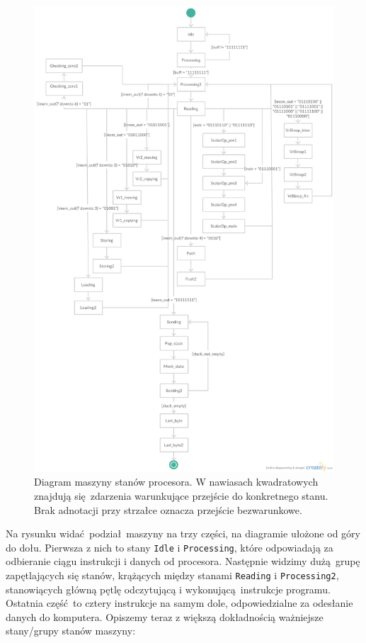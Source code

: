 \begin{figure}
  \begin{center}
    \includegraphics[scale=0.4]{images/Processor-State-Machine.png}
    \caption{Diagram maszyny stanów procesora. W nawiasach kwadratowych znajdują się zdarzenia warunkujące przejście do konkretnego stanu. Brak adnotacji przy strzałce oznacza przejście bezwarunkowe.}
    \label{fig:PSM}
  \end{center}
\end{figure}

Na rysunku widać podział maszyny na trzy części, na diagramie ułożone od góry do dołu. Pierwsza z nich to stany \texttt{Idle} i \texttt{Processing}, które odpowiadają za odbieranie ciągu instrukcji i danych od procesora. Następnie widzimy dużą grupę zapętlających się stanów, krążących między stanami \texttt{Reading} i \texttt{Processing2}, stanowiących główną pętlę odczytującą i wykonującą instrukcje programu. Ostatnia część to cztery instrukcje na samym dole, odpowiedzialne za odesłanie danych do komputera. Opiszemy teraz z większą dokładnością ważniejsze stany/grupy stanów maszyny:

